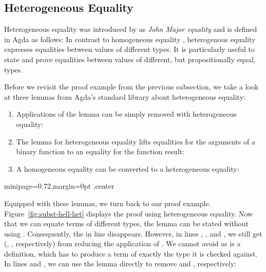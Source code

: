 \documentclass[sigplan,anonymous,review,screen]{acmart}
\newenvironment{AgdaBlock}{%
  \vspace{\AgdaEmptySkip}%
  \AgdaNoSpaceAroundCode{}%
}{%
  \AgdaSpaceAroundCode{}
  \vspace{-\AgdaEmptySkip}
}
\begin{document}


\subsection{Heterogeneous Equality}
\label{sec:subst-hell:het}

Heterogeneous equality was introduced by
\citet{DBLP:conf/types/McBride00} as \emph{John Major equality} and
is defined in Agda as follows:
\SubstExamplesHetEqDef
In contrast to homogeneous equality , heterogenous
equality expresses equalities between values of different
types. It is particularly useful to state and prove equalities between
values of different, but propositionally equal, types.

Before we revisit the proof example from the previous subsection, we take a look
at three lemmas from Agda's standard library about heterogeneous equality:

\begin{enumerate}
\item 
  Applications of the {\Asubst} lemma can be simply removed with heterogeneous equality:
  \SubstExamplesHetEqSubstRemovable
\item 
  The {} lemma for heterogeneous equality lifts
  equalities for the arguments of a binary function to an equality 
  for the function result:
  \SubstExamplesHetEqCongII
\item 
  A homogeneous equality can be converted to a heterogeneous equality:
  \SubstExamplesHetEqConv
\end{enumerate}
\begin{figure*}
  \begin{adjustbox}{minipage=0.72\textwidth,margin=0pt \smallskipamount,center}
    \begin{minipage}{1.0\linewidth}
    \begin{AgdaBlock}
      \SubstExamplesFusionESubESubHet
    \end{AgdaBlock}
    \end{minipage}
  \end{adjustbox}
  \caption{Proof of Expression Substitution Fusion with Heterogeneous Equality}
  \label{fig:subst-hell-het}
\end{figure*}
Equipped with these lemmas, we turn back to our proof example.
Figure~\ref{fig:subst-hell-het} displays the proof using heterogeneous equality.
Now that we can equate terms of different types, the lemma can be
stated without using {\Asubst}.
Consequently, the {} in line  disappears.
However, in lines , , and , we still get
{} ({}, {}, respectively) from reducing the application of {\AESub}.
We cannot avoid {} as {\AESub} is a definition, which has to
produce a term of exactly the type it is checked against.
In lines  and , we can use the {} lemma
directly to remove {} and {}, respectively:
\SubstExamplesFusionESubESubHetProofB
\end{document}
